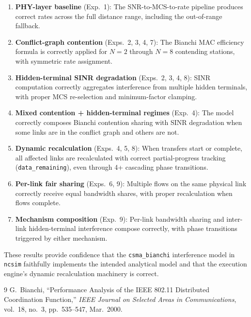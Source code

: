 \documentclass[11pt,a4paper]{article}
\newcommand{\ncsim}{\texttt{ncsim}}
\begin{document}
\begin{enumerate}    \item \textbf{PHY-layer baseline} (Exp.~1): The SNR-to-MCS-to-rate pipeline produces correct rates across the full distance range, including the out-of-range fallback.

    \item \textbf{Conflict-graph contention} (Exps.~2, 3, 4, 7): The Bianchi MAC efficiency formula is correctly applied for $N = 2$ through $N = 8$ contending stations, with symmetric rate assignment.

    \item \textbf{Hidden-terminal SINR degradation} (Exps.~2, 3, 4, 8): SINR computation correctly aggregates interference from multiple hidden terminals, with proper MCS re-selection and minimum-factor clamping.

    \item \textbf{Mixed contention + hidden-terminal regimes} (Exp.~4): The model correctly composes Bianchi contention sharing with SINR degradation when some links are in the conflict graph and others are not.

    \item \textbf{Dynamic recalculation} (Exps.~4, 5, 8): When transfers start or complete, all affected links are recalculated with correct partial-progress tracking (\texttt{data\_remaining}), even through 4+ cascading phase transitions.

    \item \textbf{Per-link fair sharing} (Exps.~6, 9): Multiple flows on the same physical link correctly receive equal bandwidth shares, with proper recalculation when flows complete.

    \item \textbf{Mechanism composition} (Exp.~9): Per-link bandwidth sharing and inter-link hidden-terminal interference compose correctly, with phase transitions triggered by either mechanism.
\end{enumerate}

These results provide confidence that the \texttt{csma\_bianchi} interference model in \ncsim{} faithfully implements the intended analytical model and that the execution engine's dynamic recalculation machinery is correct.

\begin{thebibliography}{9}
G.~Bianchi, ``Performance Analysis of the IEEE 802.11 Distributed Coordination Function,'' \emph{IEEE Journal on Selected Areas in Communications}, vol.~18, no.~3, pp.~535--547, Mar.~2000.
\end{thebibliography}
\end{document}
